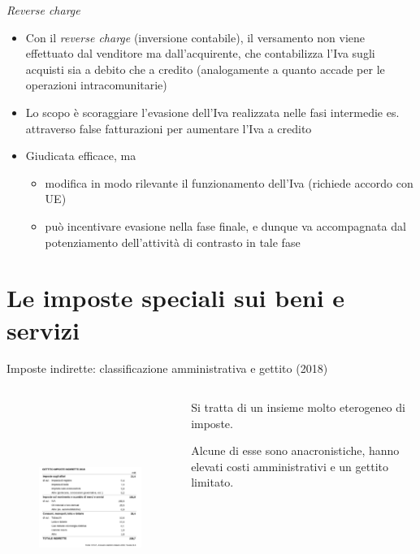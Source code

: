 \documentclass[aspectratio=149,11pt,italian]{beamer}
\begin{document}
\begin{frame}{\emph{Reverse charge}}
\begin{itemize}
\item Con il \emph{reverse charge} (inversione contabile), il versamento non viene
effettuato dal venditore ma dall'acquirente, che contabilizza l'Iva sugli
acquisti sia a debito che a credito (analogamente a quanto accade per le
operazioni intracomunitarie)
\item Lo scopo è scoraggiare l'evasione dell'Iva realizzata nelle fasi intermedie
es. attraverso false fatturazioni per aumentare l'Iva a credito
\item Giudicata efficace, ma
\begin{itemize}
\item modifica in modo rilevante il funzionamento dell'Iva (richiede accordo con
UE)
\item può incentivare evasione nella fase finale, e dunque va accompagnata dal
potenziamento dell'attività di contrasto in tale fase
\end{itemize}
\end{itemize}
\end{frame}


\section{Le imposte speciali sui beni e servizi}


\begin{frame}{Imposte indirette: classificazione amministrativa e gettito (2018)}
  \begin{columns}
    \begin{column}{.7\columnwidth}
      \begin{figure}[htbp]
        \vspace*{-5mm}
        \includegraphics[height=7cm]{./figure/imposte-indirette-2018.png}
      \end{figure}
    \end{column}
    \begin{column}{.3\columnwidth}
      Si tratta di un insieme molto eterogeneo di imposte.
      \bigskip

      Alcune di esse sono anacronistiche, hanno elevati costi amministrativi e un
      gettito limitato.
    \end{column}
  \end{columns}
\end{frame}
\end{document}
